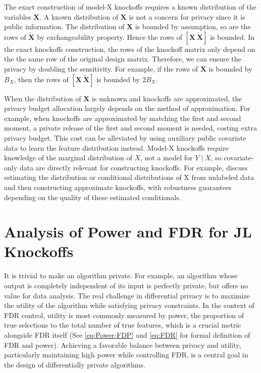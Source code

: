 \documentclass[11pt]{article}
\newcommand{\bX}{\boldsymbol{X}}
\newcommand{\bXT}{\widetilde{\bX} }
\begin{document}
The exact construction of model-X knockoffs requires a known distribution of the variables $\bX$. A known distribution of $\bX$ is not a concern for privacy since it is public information. The distribution of $\bX$ is bounded by assumption, so are the rows of $\bXT$ by exchangeability property. Hence the rows of $[\bX\ \bXT]$ is bounded. In the exact knockoffs construction, the rows of the knockoff matrix only depend on the the same row of the original design matrix. Therefore, we can ensure the privacy by doubling the sensitivity. For example, if the rows of $\bX$ is bounded by $B_X$, then the rows of $[\bX\ \bXT]$ is bounded by $2B_X$. 

When the distribution of $\bX$ is unknown and knockoffs are approximated, the privacy budget allocation largely depends on the method of approximation. For example, when knockoffs are approximated by matching the first and second moment, a private release of the first and second moment is needed, costing extra privacy budget. This cost can be alleviated by using auxiliary public covariate data to learn the feature distribution instead. Model-X knockoffs require knowledge of the marginal distribution of $X$, not a model for $Y\mid X$, so covariate-only data are directly relevant for constructing knockoffs. For example, \cite{barber2020robust} discuss estimating the distribution or conditional distributions of X from unlabeled data and then constructing approximate knockoffs, with robustness guarantees depending on the quality of these estimated conditionals.

     
\section{Analysis of Power and FDR for JL Knockoffs}\label{sec:utility}
It is trivial to make an algorithm private. For example, an algorithm whose output is completely independent of its input is perfectly private, but offers no value for data analysis. The real challenge in differential privacy is to maximize the utility of the algorithm while satisfying privacy constraints. In the context of FDR control, utility is most commonly measured by power, the proportion of true selections to the total number of true features, which is a crucial metric alongside FDR itself (See \eqref{eq:Power-FDP}  and \eqref{eq:FDR} for formal definition of FDR and power). Achieving a favorable balance between privacy and utility, particularly maintaining high power while controlling FDR, is a central goal in the design of differentially private algorithms. 
\end{document}
